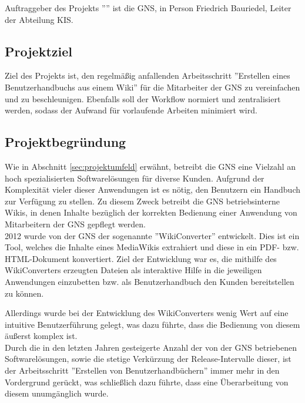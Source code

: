 \documentclass[12pt, xcolor=dvipsnames]{scrartcl}
\begin{document}
Auftraggeber des Projekts ''\Projekt'' ist die GNS, in Person Friedrich Bauriedel, Leiter der Abteilung KIS.


\subsection{Projektziel}

Ziel des Projekts ist, den regelmäßig anfallenden Arbeitsschritt ''Erstellen eines Benutzerhandbuchs aus einem Wiki'' für die Mitarbeiter der GNS zu vereinfachen und zu beschleunigen. Ebenfalls soll der Workflow normiert und zentralisiert werden, sodass der Aufwand für vorlaufende Arbeiten minimiert wird.

\subsection{Projektbegründung}
\label{sec:projektbegründung}

Wie in Abschnitt \ref{sec:projektumfeld} erwähnt, betreibt die GNS eine Vielzahl an hoch spezialisierten Softwarelösungen für diverse Kunden. Aufgrund der Komplexität vieler dieser Anwendungen ist es nötig, den Benutzern ein Handbuch zur Verfügung zu stellen.
Zu diesem Zweck betreibt die GNS betriebsinterne Wikis, in denen Inhalte bezüglich der korrekten Bedienung einer Anwendung von Mitarbeitern der GNS gepflegt werden. \\

2012 wurde von der GNS der sogenannte ''WikiConverter'' entwickelt. Dies ist ein Tool, welches die Inhalte eines MediaWikis extrahiert und diese in ein PDF- bzw. HTML-Dokument konvertiert.
Ziel der Entwicklung war es, die mithilfe des WikiConverters erzeugten Dateien als interaktive Hilfe in die jeweiligen Anwendungen einzubetten bzw. als Benutzerhandbuch den Kunden bereitstellen zu können.

Allerdings wurde bei der Entwicklung des WikiConverters wenig Wert auf eine intuitive Benutzerführung gelegt, was dazu führte, dass die Bedienung von diesem äußerst komplex ist. \\

Durch die in den letzten Jahren gesteigerte Anzahl der von der GNS betriebenen Softwarelösungen, sowie die stetige Verkürzung der Release-Intervalle dieser, ist der Arbeitsschritt ''Erstellen von Benutzerhandbüchern'' immer mehr in den Vordergrund gerückt, was schließlich dazu führte, dass eine Überarbeitung von diesem unumgänglich wurde. \\
\end{document}
